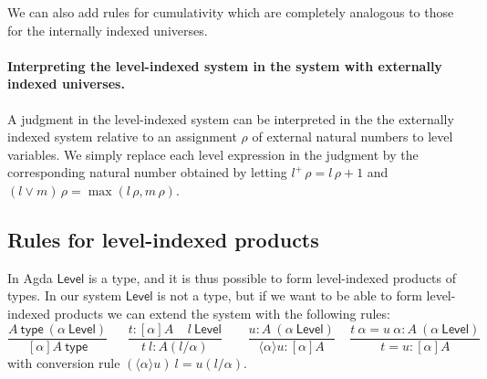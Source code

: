 \documentclass[11pt,a4paper]{article}
\newcommand{\lam}[2]{{\langle}#1{\rangle}#2}
\def\NN{\mathsf{N}}
\def\UU{\mathsf{U}}
\def\Level{\mathsf{Level}}
\newcommand{\type}{\mathsf{type}}
\newcommand{\T}{\mathsf{T}}
\begin{document}
We can also add rules for cumulativity which are completely analogous to those for the internally indexed universes.

\paragraph{Interpreting the level-indexed system in the system with externally indexed universes.}

A judgment in the level-indexed system can be interpreted in the the externally indexed system relative to an assignment $\rho$ of external natural numbers to level variables. We simply replace each level expression in the judgment by the corresponding natural number obtained by letting $l^+\,\rho = l\,\rho+1$ and $(l \vee m)\,\rho = \max(l\,\rho,m\,\rho)$.

%
%
%
%
%
%
%

\subsection*{Rules for level-indexed products}

In Agda $\Level$ is a type, and it is thus possible to form level-indexed products of types. In our system $\Level$ is not a type, but if we want to be able to form level-indexed products we can extend the system with the following rules:
$$
\frac{A~\type~(\alpha~\Level)}{[\alpha]A~\type}~~~~~~~
\frac{t:[\alpha]A~~~~~l~\Level}
     {t~l:A(l/\alpha)}~~~~~~~~~
\frac{u:A~(\alpha~\Level)}{\lam{\alpha}{u}: [\alpha]A}~~~~~
\frac{t~\alpha = u~\alpha:A~(\alpha~\Level)}{t = u:[\alpha]A}
$$
with conversion rule $(\lam{\alpha}{u})~l = u(l/\alpha)$.
\end{document}
